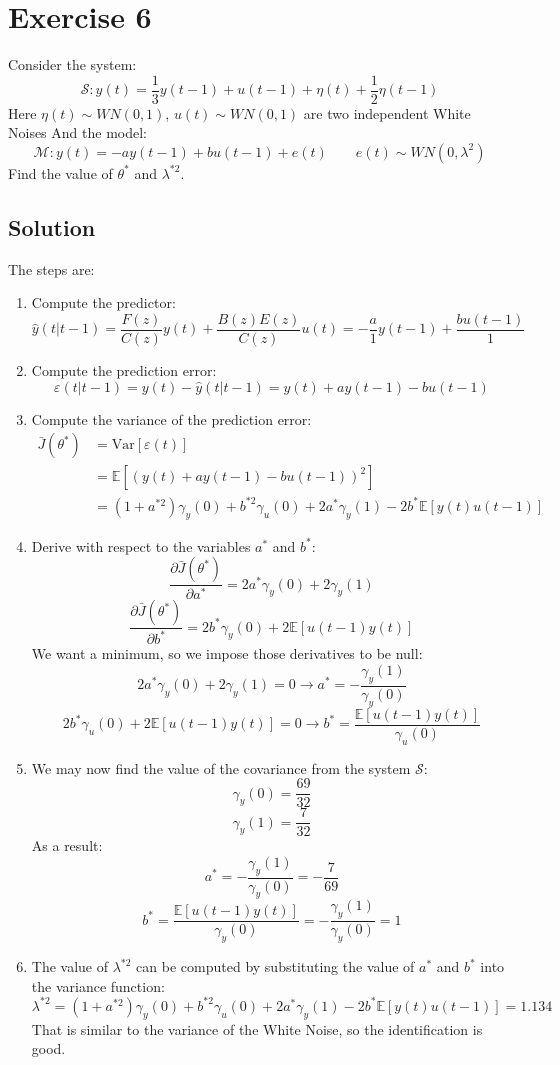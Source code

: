 \section{Exercise 6}

Consider the system: 
\[\mathcal{S}:y(t)=\dfrac{1}{3}y(t-1)+u(t-1)+\eta(t)+\dfrac{1}{2}\eta(t-1)\]
Here $\eta(t)\sim WN(0,1)$, $u(t)\sim WN(0,1)$ are two independent  White Noises
And the model: 
\[\mathcal{M}:y(t)=-ay(t-1)+bu(t-1)+e(t) \qquad e(t)\sim WN(0,\lambda^2)\]
Find the value of $\theta^\ast$ and $\lambda^{\ast 2}$. 

\subsection*{Solution}
The steps are: 
\begin{enumerate}
    \item Compute the predictor: 
        \[\hat{y}(t|t-1)=\dfrac{F(z)}{C(z)}y(t)+\dfrac{B(z)E(z)}{C(z)}u(t)=-\dfrac{a}{1}y(t-1)+\dfrac{bu(t-1)}{1}\]
    \item Compute the prediction error: 
        \[\varepsilon(t|t-1)=y(t)-\hat{y}(t|t-1)=y(t)+ay(t-1)-bu(t-1)\]
    \item Compute the variance of the prediction error: 
        \begin{align*}
            \bar{J}(\theta^\ast)    &=\text{Var}\left[\varepsilon(t)\right]\\   
                                    &=\mathbb{E}\left[ {\left(y(t)+ay(t-1)-bu(t-1)\right)}^2 \right] \\
                                    &=\left(1+a^{\ast 2}\right)\gamma_y(0)+b^{\ast 2}\gamma_u(0)+2a^\ast \gamma_y(1)-2b^\ast\mathbb{E}\left[y(t)u(t-1)\right]
        \end{align*}
    \item Derive with respect to the variables $a^\ast$ and $b^\ast$: 
        \[\dfrac{\partial\bar{J}(\theta^\ast)}{\partial a^\ast}=2a^\ast\gamma_y(0)+2\gamma_y(1)\]
        \[\dfrac{\partial\bar{J}(\theta^\ast)}{\partial b^\ast}=2b^\ast\gamma_y(0)+2\mathbb{E}\left[u(t-1)y(t)\right]\]
        We want a minimum, so we impose those derivatives to be null: 
        \[2a^\ast\gamma_y(0)+2\gamma_y(1)=0 \rightarrow a^\ast=-\dfrac{\gamma_y(1)}{\gamma_y(0)}\]
        \[2b^\ast\gamma_u(0)+2\mathbb{E}\left[u(t-1)y(t)\right]=0 \rightarrow b^\ast=\dfrac{\mathbb{E}\left[u(t-1)y(t)\right]}{\gamma_u(0)}\]
    \item We may now find the value of the covariance from the system $\mathcal{S}$: 
        \[\gamma_y(0)=\dfrac{69}{32}\]
        \[\gamma_y(1)=\dfrac{7}{32}\]
        As a result: 
        \[a^\ast=-\dfrac{\gamma_y(1)}{\gamma_y(0)}=-\dfrac{7}{69}\]
        \[b^\ast=\dfrac{\mathbb{E}\left[u(t-1)y(t)\right]}{\gamma_y(0)}=-\dfrac{\gamma_y(1)}{\gamma_y(0)}=1\]
    \item The value of $\lambda^{\ast 2}$ can be computed by substituting the value of $a^\ast$ and $b^\ast$ into the variance function: 
        \[\lambda^{\ast 2}=\left(1+a^{\ast 2}\right)\gamma_y(0)+b^{\ast 2}\gamma_u(0)+2a^\ast\gamma_y(1)-2b^\ast\mathbb{E}\left[y(t)u(t-1)\right]=1.134\]
        That is similar to the variance of the  White Noise, so the identification is good. 
\end{enumerate}